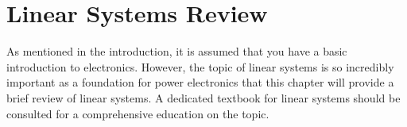 \chapter{Linear Systems Review}

As mentioned in the introduction, it is assumed that you have a basic introduction to electronics. However, the topic of linear systems is so incredibly important as a foundation for power electronics that this chapter will provide a brief review of linear systems. A dedicated textbook for linear systems should be consulted for a comprehensive education on the topic.










